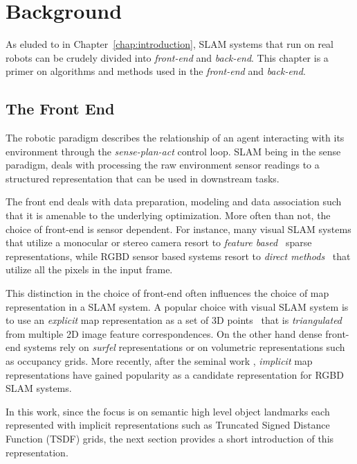 \chapter{Background} \label{chap:background}

As eluded to in Chapter~\ref{chap:introduction}, SLAM systems that run on real robots can be crudely divided into \emph{front-end} and \emph{back-end}. This chapter is a primer on algorithms and methods used in the \emph{front-end} and \emph{back-end}.

\section{The Front End}

The robotic paradigm describes the relationship of an agent interacting with its environment through the \emph{sense-plan-act} control loop. SLAM being in the sense paradigm, deals with processing the raw environment sensor readings to a structured representation that can be used in downstream tasks.

The front end deals with data preparation, modeling and data association such that it is amenable to the underlying optimization. More often than not, the choice of front-end is sensor dependent. For instance, many visual SLAM systems that utilize a monocular or stereo camera resort to \emph{feature based}~\cite{qinVINSMonoRobustVersatile2018, loiannoVisualInertialOdometry2016} sparse representations, while RGBD sensor based systems resort to \emph{direct methods}~\cite{newcombeKinectFusionRealtimeDense2011, whelanElasticFusionDenseSLAM2015} that utilize all the pixels in the input frame.

This distinction in the choice of front-end often influences the choice of map representation in a SLAM system. A popular choice with visual SLAM system is to use an \emph{explicit} map representation as a set of 3D points~\cite{mur-artalORBSLAM2OpenSourceSLAM2017} that is \emph{triangulated} from multiple 2D image feature correspondences. On the other hand dense front-end systems rely on \emph{surfel} representations or on volumetric representations such as occupancy grids. More recently, after the seminal work \cite{newcombeKinectFusionRealtimeDense2011}, \emph{implicit} map representations have gained popularity as a candidate representation for RGBD SLAM systems.

In this work, since the focus is on semantic high level object landmarks each represented with implicit representations such as Truncated Signed Distance Function (TSDF) grids, the next section provides a short introduction of this representation.

